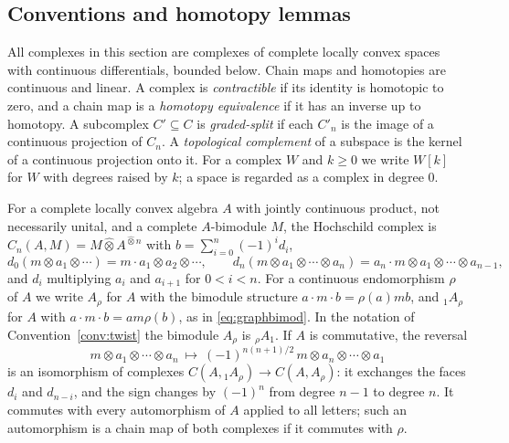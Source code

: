 \documentclass[11pt]{amsart}
\theoremstyle{definition}
\theoremstyle{remark}
\begin{document}
\subsection{Conventions and homotopy lemmas}

All complexes in this section are complexes of complete locally convex spaces
with continuous differentials, bounded below.  Chain maps and homotopies are
continuous and linear.  A complex is \emph{contractible} if its identity is
homotopic to zero, and a chain map is a \emph{homotopy equivalence} if it has
an inverse up to homotopy.  A subcomplex $C'\subseteq C$ is
\emph{graded-split} if each $C'_n$ is the image of a continuous projection of
$C_n$.  A \emph{topological complement} of a subspace is the kernel of a
continuous projection onto it.  For a complex $W$ and $k\ge0$ we write $W[k]$
for $W$ with degrees raised by $k$; a space is regarded as a complex in
degree $0$.

For a complete locally convex algebra $A$ with jointly continuous product, not
necessarily unital, and a complete $A$-bimodule $M$, the Hochschild complex is
$C_n(A,M)=M\widehat\otimes A^{\widehat\otimes n}$ with $b=\sum_{i=0}^{n}(-1)^{i}d_i$,
\[
d_0(m\otimes a_1\otimes\cdots)=m\cdot a_1\otimes a_2\otimes\cdots,\qquad
d_n(m\otimes a_1\otimes\cdots\otimes a_n)=a_n\cdot m\otimes a_1\otimes\cdots\otimes a_{n-1},
\]
and $d_i$ multiplying $a_i$ and $a_{i+1}$ for $0<i<n$.  For a continuous
endomorphism $\rho$ of $A$ we write $A_{\rho}$ for $A$ with the bimodule
structure $a\cdot m\cdot b=\rho(a)mb$, and ${}_{1}A_{\rho}$ for $A$ with
$a\cdot m\cdot b=am\rho(b)$, as in \eqref{eq:graphbimod}.  In the notation
of Convention~\ref{conv:twist} the bimodule $A_{\rho}$ is ${}_{\rho}A_{1}$.  If $A$ is
commutative, the reversal
\begin{equation}\label{eq:reversal}
m\otimes a_1\otimes\cdots\otimes a_n\ \longmapsto\ (-1)^{n(n+1)/2}\,m\otimes
a_n\otimes\cdots\otimes a_1
\end{equation}
is an isomorphism of complexes $C(A,{}_{1}A_{\rho})\to C(A,A_{\rho})$: it
exchanges the faces $d_i$ and $d_{n-i}$, and the sign changes by $(-1)^{n}$
from degree $n-1$ to degree $n$.  It commutes with every automorphism of $A$
applied to all letters; such an automorphism is a chain map of both complexes
if it commutes with $\rho$.
\end{document}

